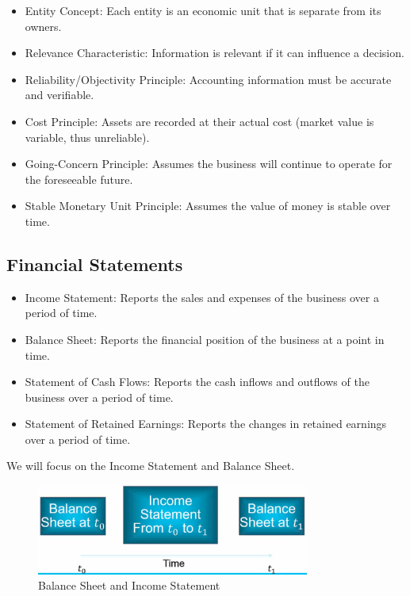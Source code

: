 \begin{theorem}
    \begin{itemize}
        \item Entity Concept: Each entity is an economic unit that is separate from its owners.
        \item Relevance Characteristic: Information is relevant if it can influence a decision.
        \item Reliability/Objectivity Principle: Accounting information must be accurate and verifiable.
        \item Cost Principle: Assets are recorded at their actual cost (market value is variable, thus unreliable).
        \item Going-Concern Principle: Assumes the business will continue to operate for the foreseeable future.
        \item Stable Monetary Unit Principle: Assumes the value of money is stable over time.
    \end{itemize}
\end{theorem}

\subsection{Financial Statements}

\begin{theorem}
    \begin{itemize}
        \item Income Statement: Reports the sales and expenses of the business over a period of time.
        \item Balance Sheet: Reports the financial position of the business at a point in time.
        \item Statement of Cash Flows: Reports the cash inflows and outflows of the business over a period of time.
        \item Statement of Retained Earnings: Reports the changes in retained earnings over a period of time.
    \end{itemize}
    We will focus on the Income Statement and Balance Sheet.
\end{theorem}

\begin{figure}[H]
    \centering
    \includegraphics[width=0.8\textwidth]{LECTURE_8/balance-and-income.png}
    \caption{Balance Sheet and Income Statement}

\end{figure}

